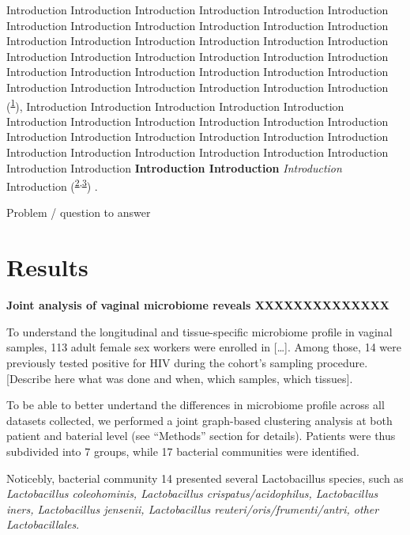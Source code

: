 \documentclass[
]{article}
\begin{document}
Introduction Introduction Introduction Introduction Introduction Introduction Introduction Introduction Introduction Introduction Introduction Introduction Introduction Introduction Introduction Introduction Introduction Introduction Introduction Introduction Introduction Introduction Introduction Introduction Introduction Introduction Introduction Introduction Introduction Introduction Introduction Introduction Introduction Introduction Introduction Introduction (\textsuperscript{\protect\hyperlink{ref-Johnston1972}{1}}), Introduction Introduction Introduction Introduction Introduction Introduction Introduction Introduction Introduction Introduction Introduction Introduction Introduction Introduction Introduction Introduction Introduction Introduction Introduction Introduction Introduction Introduction Introduction Introduction Introduction \textbf{Introduction Introduction} \emph{Introduction} Introduction (\textsuperscript{\protect\hyperlink{ref-Darwin1859}{2}}\textsuperscript{,}\textsuperscript{\protect\hyperlink{ref-Bumpus1898}{3}}) .

Problem / question to answer

\clearpage

\hypertarget{results}{%
\section{Results}\label{results}}

\textbf{Joint analysis of vaginal microbiome reveals XXXXXXXXXXXXXX}

To understand the longitudinal and tissue-specific microbiome profile in vaginal samples, 113 adult female sex workers were enrolled in {[}\ldots{]}. Among those, 14 were previously tested positive for HIV during the cohort's sampling procedure. {[}Describe here what was done and when, which samples, which tissues{]}.

To be able to better undertand the differences in microbiome profile across all datasets collected, we performed a joint graph-based clustering analysis at both patient and baterial level (see ``Methods'' section for details). Patients were thus subdivided into 7 groups, while 17 bacterial communities were identified.

Noticebly, bacterial community 14 presented several Lactobacillus species, such as \emph{Lactobacillus coleohominis, Lactobacillus crispatus/acidophilus, Lactobacillus iners, Lactobacillus jensenii, Lactobacillus reuteri/oris/frumenti/antri, other Lactobacillales}.
\end{document}
